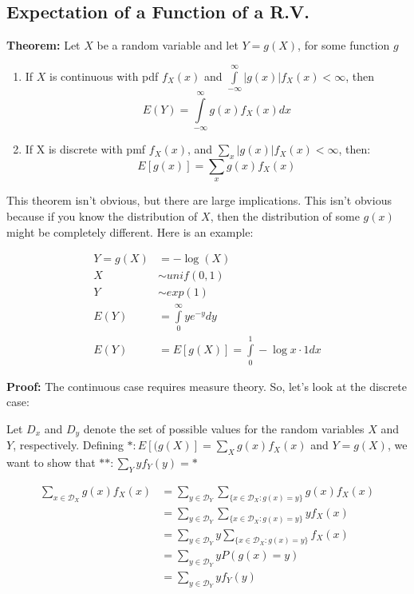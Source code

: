 \documentclass{article}
\begin{document}
\subsection{Expectation of a Function of a R.V.}

\textbf{Theorem:} Let $X$ be a random variable and let $Y = g(X)$, for some function $g$
\begin{enumerate}
    \item If $X$ is continuous with pdf $f_X(x)$ and $\int\limits_{-\infty}^\infty |g(x)| f_X(x) < \infty$, then
    \begin{equation*}
        E(Y) = \int\limits_{-\infty}^\infty g(x) f_X(x) dx
    \end{equation*}
    
    \item  If X is discrete with pmf $f_X(x)$, and $\sum\limits_x |g(x)|f_X(x) < \infty$, then:
    \begin{equation*}
        E[g(x)] = \sum\limits_x g(x) f_X(x)
    \end{equation*}
\end{enumerate}

\noindent This theorem isn't obvious, but there are large implications. This isn't obvious because if you know the distribution of $X$, then the distribution of some $g(x)$ might be completely different. Here is an example:

\begin{equation*}
    \begin{split}
        Y = g(X) &= -\log(X)\\
        X &\sim unif(0,1)\\
        Y &\sim exp(1)\\
        E(Y) &= \int\limits_0^\infty y e^{-y}dy\\
        E(Y) &= E[g(X)] = \int\limits_0^1 -\log x \cdot 1 dx
    \end{split}
\end{equation*}

\noindent \textbf{Proof:} The continuous case requires measure theory. So, let's look at the discrete case:

Let $D_x$ and $D_y$ denote the set of possible values for the random variables $X$ and $Y$, respectively. Defining $*: E[(g(X)] = \sum\limits_X g(x)f_X(x)$ and $Y=g(X)$, we want to show that $**: \sum\limits_Y y f_Y(y) = *$

\begin{equation*}
\begin{split}
    \sum_{x\in \mathcal{D}_X} g(x) f_X(x) &= \sum_{y\in \mathcal{D}_Y} \sum_{\{x \in \mathcal{D}_X : g(x) = y\}} g(x) f_X(x)\\
    &= \sum_{y\in \mathcal{D}_Y} \sum_{\{x \in \mathcal{D}_X : g(x) = y\}} y f_X(x)\\
    &= \sum_{y\in \mathcal{D}_Y} y \sum_{\{x \in \mathcal{D}_X : g(x) = y\}} f_X(x)\\
    &= \sum_{y\in \mathcal{D}_Y} y P(g(x) = y)\\
    &= \sum_{y\in \mathcal{D}_Y} y f_Y(y)
\end{split}
\end{equation*}
\end{document}
